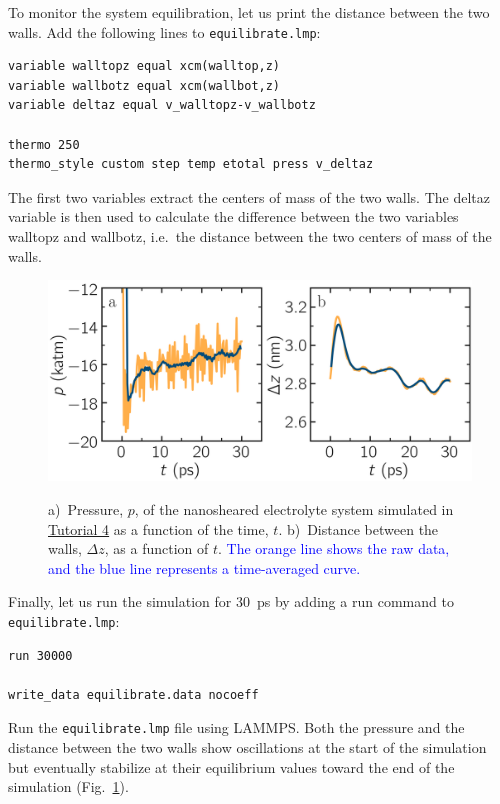 \documentclass[9pt,tutorial]{livecoms}
\newcommand{\lmpcmd}[1]{\colorbox{listing}{\textcolor{command}{\small{#1}}}} %
\newcommand{\flecmd}[1]{\textcolor{command}{\texttt{#1}}} %
\begin{document}
To monitor the system equilibration, let us print the distance between
the two walls.  Add the following lines to \flecmd{equilibrate.lmp}:
\begin{lstlisting}
variable walltopz equal xcm(walltop,z)
variable wallbotz equal xcm(wallbot,z)
variable deltaz equal v_walltopz-v_wallbotz

thermo 250
thermo_style custom step temp etotal press v_deltaz
\end{lstlisting}
The first two variables extract the centers of mass of the two walls.  The
\lmpcmd{deltaz} variable is then used to calculate the difference between the two
variables \lmpcmd{walltopz} and \lmpcmd{wallbotz}, i.e.~the distance between the
two centers of mass of the walls.

\begin{figure}
\centering
\includegraphics[width=\linewidth]{NANOSHEAR-equilibration}\\[-2ex]
\caption{a)~Pressure, $p$, of the nanosheared electrolyte system
simulated in \hyperref[sheared-confined-label]{Tutorial 4} as a function of the
time, $t$.  b)~Distance between the walls, $\Delta z$, as a function of $t$.
\textcolor{blue}{The orange line
shows the raw data, and the blue line represents a time-averaged curve.}}
\label{fig:NANOSHEAR-equilibration}
\end{figure}

Finally, let us run the simulation for 30~ps by adding a \lmpcmd{run} command
to \flecmd{equilibrate.lmp}:
\begin{lstlisting}
run 30000

write_data equilibrate.data nocoeff
\end{lstlisting}
Run the \flecmd{equilibrate.lmp} file using LAMMPS.  Both the pressure and the distance
between the two walls show oscillations at the start of the simulation
but eventually stabilize at their equilibrium values toward
the end of the simulation (Fig.~\ref{fig:NANOSHEAR-equilibration}).
\end{document}
